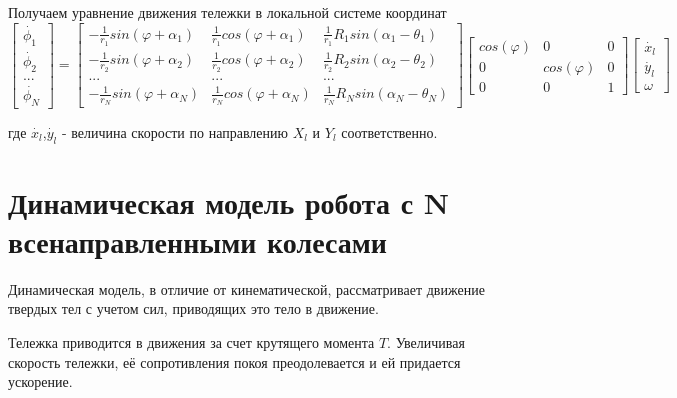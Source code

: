 \documentclass[oneside,final,14pt]{extreport}
\begin{document}
Получаем уравнение движения тележки в локальной системе координат
\begin{equation}
\begin{bmatrix}
\dot{\phi_{1}} \\
\dot{\phi_{2}} \\
...\\
\dot{\phi_{N}}
\end{bmatrix}
=
\begin{bmatrix}
-\frac{1}{r_{1}}sin(\varphi +\alpha_{1}) &
\frac{1}{r_{1}}cos(\varphi +\alpha_{1}) &
\frac{1}{r_{1}}R_{1}sin(\alpha_{1} - \theta_{1})
\\
-\frac{1}{r_{2}}sin(\varphi +\alpha_{2}) &
\frac{1}{r_{2}}cos(\varphi +\alpha_{2}) &
\frac{1}{r_{2}}R_{2}sin(\alpha_{2} - \theta_{2})
\\
... & ... & ...
\\
-\frac{1}{r_{N}}sin(\varphi +\alpha_{N}) &
\frac{1}{r_{N}}cos(\varphi +\alpha_{N}) &
\frac{1}{r_{N}}R_{N}sin(\alpha_{N} - \theta_{N})
\end{bmatrix}
\begin{bmatrix}
cos(\varphi) & 0 & 0 \\
0 & cos(\varphi) & 0 \\
0 & 0 & 1
\end{bmatrix}
\begin{bmatrix}
\dot{x_{l}} \\
\dot{y_{l}} \\
\omega
\end{bmatrix}
\end{equation}

где $\dot{x_{l}}$,$\dot{y_{l}}$ - величина скорости по направлению $X_{l}$ и  $Y_{l}$ соответственно.
\fi

\chapter{Динамическая модель робота с N всенаправленными колесами}
Динамическая модель, в отличие от кинематической, рассматривает движение твердых тел с учетом сил, приводящих это тело в движение.
 
Тележка приводится в движения за счет крутящего момента $T$. Увеличивая скорость тележки, её сопротивления покоя преодолевается и ей придается ускорение. 
 
\end{document}
